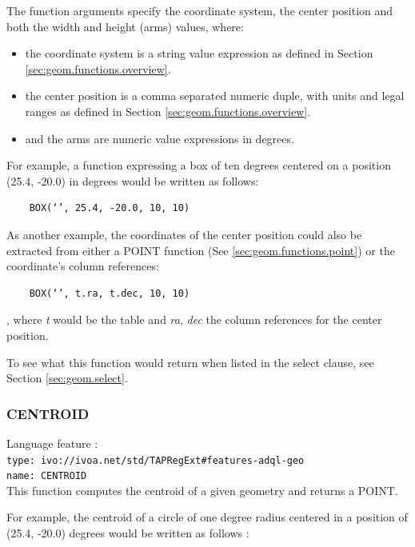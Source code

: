 \documentclass[11pt,a4paper]{ivoa}
\begin{document}
The function arguments specify the coordinate system, the center position
and both the width and height (arms) values, where:

\begin{itemize}
    \item the coordinate system is a string value expression as defined in Section \ref{sec:geom.functions.overview}.
    \item the center position is a comma separated numeric duple, with units and legal ranges as defined in Section \ref{sec:geom.functions.overview}.
    \item and the arms are numeric value expressions in degrees.
\end{itemize}

For example, a function expressing a box of ten degrees centered on a position
(25.4, -20.0) in degrees would be written as follows:

\begin{verbatim}
    BOX(‘’, 25.4, -20.0, 10, 10)
\end{verbatim}

As another example, the coordinates of the center position could also be
extracted from either a POINT function (See \ref{sec:geom.functions.point})
or the coordinate’s column references:

\begin{verbatim}
    BOX(‘’, t.ra, t.dec, 10, 10)
\end{verbatim}

, where \textit{t} would be the table and \textit{ra}, \textit{dec} the
column references for the center position.

To see what this function would return when listed in the select clause,
see Section \ref{sec:geom.select}.

\subsubsection{CENTROID}
\label{sec:geom.functions.centroid}
{\footnotesize Language feature :}\\
{\footnotesize \verb|type: ivo://ivoa.net/std/TAPRegExt#features-adql-geo|}\\
{\footnotesize \verb|name: CENTROID|}\\

This function computes the centroid of a given geometry and returns a POINT.

For example, the centroid of a circle of one degree radius centered in a
position of (25.4, -20.0) degrees would be written as follows :
\end{document}
